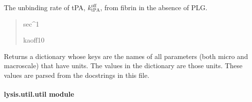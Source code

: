 \documentclass[letterpaper,10pt,english]{sphinxmanual}
\begin{document}
\begin{fulllineitems}
\begin{fulllineitems}
\label{\detokenize{lysis.util:lysis.util.parameters.MicroParameters.unbind_rate_tPA_woPLG}}
\pysigstartsignatures
{}
\pysigstopsignatures
\sphinxAtStartPar
The unbinding rate of tPA, \(k^\text{off}_\text{tPA}\),
from fibrin in the absence of PLG.
\begin{quote}\begin{description}
\sphinxAtStartPar
sec\textasciicircum{}\sphinxhyphen{}1

\sphinxAtStartPar
kaoff10

\end{description}\end{quote}

\end{fulllineitems}


\begin{fulllineitems}
\label{\detokenize{lysis.util:lysis.util.parameters.MicroParameters.units}}
\pysigstartsignatures
{}
\pysigstopsignatures
\sphinxAtStartPar
Returns a dictionary whose keys are the names of all parameters (both micro\sphinxhyphen{} and macroscale)
that have units. The values in the dictionary are those units.
These values are parsed from the docstrings in this file.

\end{fulllineitems}


\end{fulllineitems}



\paragraph{lysis.util.util module}
\label{\detokenize{lysis.util:module-lysis.util.util}}\label{\detokenize{lysis.util:lysis-util-util-module}}
\end{document}
